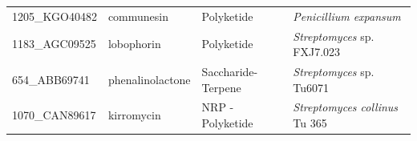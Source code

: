 \documentclass[12pt,twoside]{reedthesis}
\begin{document}
\begin{longtable}[]{@{}llll@{}}
  \begin{minipage}[t]{0.19\columnwidth}\raggedright\strut
  1205\_KGO40482\strut
  \end{minipage} & \begin{minipage}[t]{0.20\columnwidth}\raggedright\strut
  communesin\strut
  \end{minipage} & \begin{minipage}[t]{0.15\columnwidth}\raggedright\strut
  Polyketide\strut
  \end{minipage} & \begin{minipage}[t]{0.34\columnwidth}\raggedright\strut
  \emph{Penicillium expansum}\strut
  \end{minipage}\tabularnewline
  \begin{minipage}[t]{0.19\columnwidth}\raggedright\strut
  1183\_AGC09525\strut
  \end{minipage} & \begin{minipage}[t]{0.20\columnwidth}\raggedright\strut
  lobophorin\strut
  \end{minipage} & \begin{minipage}[t]{0.15\columnwidth}\raggedright\strut
  Polyketide\strut
  \end{minipage} & \begin{minipage}[t]{0.34\columnwidth}\raggedright\strut
  \emph{Streptomyces} sp. FXJ7.023\strut
  \end{minipage}\tabularnewline
  \begin{minipage}[t]{0.19\columnwidth}\raggedright\strut
  654\_ABB69741\strut
  \end{minipage} & \begin{minipage}[t]{0.20\columnwidth}\raggedright\strut
  phenalinolactone\strut
  \end{minipage} & \begin{minipage}[t]{0.15\columnwidth}\raggedright\strut
  Saccharide-Terpene\strut
  \end{minipage} & \begin{minipage}[t]{0.34\columnwidth}\raggedright\strut
  \emph{Streptomyces} sp. Tu6071\strut
  \end{minipage}\tabularnewline
  \begin{minipage}[t]{0.19\columnwidth}\raggedright\strut
  1070\_CAN89617\strut
  \end{minipage} & \begin{minipage}[t]{0.20\columnwidth}\raggedright\strut
  kirromycin\strut
  \end{minipage} & \begin{minipage}[t]{0.15\columnwidth}\raggedright\strut
  NRP - Polyketide\strut
  \end{minipage} & \begin{minipage}[t]{0.34\columnwidth}\raggedright\strut
  \emph{Streptomyces collinus} Tu 365\strut
  \end{minipage}\tabularnewline
  \bottomrule
  \end{longtable}
  
\end{document}
